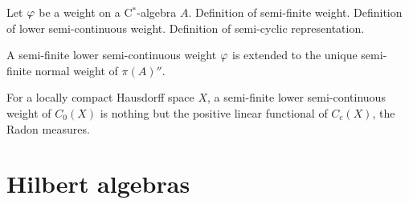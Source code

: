 \documentclass{../../large}
\begin{document}
\begin{prb}
Let $\varphi$ be a weight on a C$^*$-algebra $A$.
Definition of semi-finite weight.
Definition of lower semi-continuous weight.
Definition of semi-cyclic representation.

\begin{parts}
\item A semi-finite lower semi-continuous weight $\varphi$ is extended to the unique semi-finite normal weight of $\pi(A)''$.
\item For a locally compact Hausdorff space $X$, a semi-finite lower semi-continuous weight of $C_0(X)$ is nothing but the positive linear functional of $C_c(X)$, the Radon measures.
\end{parts}
\end{prb}






\section{Hilbert algebras}
\end{document}
